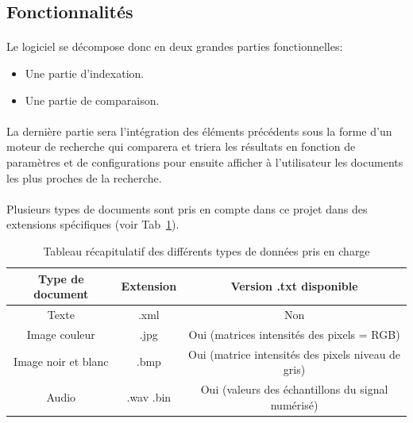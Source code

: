 \documentclass[../main.tex]{subfiles}
\begin{document}
    \subsection{Fonctionnalités}
    \paragraph{}
    Le logiciel se décompose donc en deux grandes parties fonctionnelles:
    \begin{itemize}
        \item Une partie d’indexation.
        \item Une partie de comparaison.
    \end{itemize}

    \paragraph{}
    La dernière partie sera l'intégration des éléments précédents sous la forme d’un moteur de recherche qui comparera et triera les résultats en fonction de paramètres et de configurations pour ensuite afficher à l’utilisateur les documents les plus proches de la recherche.

    \paragraph{}
    Plusieurs types de documents sont pris en compte dans ce projet dans des extensions spécifiques (voir Tab~\ref{fig:ext_types}).  	

    \begin{table}[H]
        \centering
        \begin{tabular}{| c | c | c |}
            \hline
            \rowcolor{Gray}Type de document & Extension & Version .txt disponible \\
            \hline
            Texte & .xml & Non \\
            \hline
            Image couleur & .jpg & Oui (matrices intensités des pixels = RGB) \\
            \hline
            Image noir et blanc & .bmp & Oui (matrice intensités des pixels niveau de gris) \\
            \hline
            Audio & .wav .bin &  Oui (valeurs des échantillons du signal numérisé) \\
            \hline
        \end{tabular}

        \caption{Tableau récapitulatif des différents types de données pris en charge}
        \label{fig:ext_types}
    \end{table}
\end{document}
